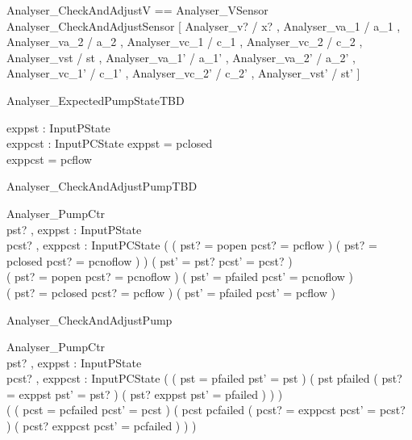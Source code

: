 \documentclass{article}
\begin{document}
\begin{zed}
	Analyser\_CheckAndAdjustV == Analyser\_VSensor \land Analyser\_CheckAndAdjustSensor [ Analyser\_v? / x? , Analyser\_va\_1 / a\_1 , Analyser\_va\_2 / a\_2 , Analyser\_vc\_1 / c\_1 , Analyser\_vc\_2 / c\_2 , Analyser\_vst / st , Analyser\_va\_1' / a\_1' , Analyser\_va\_2' / a\_2' , Analyser\_vc\_1' / c\_1' , Analyser\_vc\_2' / c\_2' , Analyser\_vst' / st' ]
\end{zed}

\begin{schema}{Analyser\_ExpectedPumpStateTBD}

 exppst : InputPState \\
 exppcst : InputPCState 
\where
 exppst = pclosed \\
 exppcst = pcflow
\end{schema}

\begin{schema}{Analyser\_CheckAndAdjustPumpTBD}

 \Delta Analyser\_PumpCtr \\
 pst? , exppst : InputPState \\
 pcst? , exppcst : InputPCState 
\where
 ( ( pst? = popen \land pcst? = pcflow ) \lor ( pst? = pclosed \land pcst? = pcnoflow ) ) \implies ( pst' = pst? \land pcst' = pcst? ) \\
 ( pst? = popen \land pcst? = pcnoflow ) \implies ( pst' = pfailed \land pcst' = pcnoflow ) \\
 ( pst? = pclosed \land pcst? = pcflow ) \implies ( pst' = pfailed \land pcst' = pcflow )
\end{schema}

\begin{schema}{Analyser\_CheckAndAdjustPump}

 \Delta Analyser\_PumpCtr \\
 pst? , exppst : InputPState \\
 pcst? , exppcst : InputPCState 
\where
 ( ( pst = pfailed \land pst' = pst ) \lor ( pst \neq pfailed \land ( pst? = exppst \implies pst' = pst? ) \land ( pst? \neq exppst \implies pst' = pfailed ) ) ) \\
 ( ( pcst = pcfailed \land pcst' = pcst ) \lor ( pcst \neq pcfailed \land ( pcst? = exppcst \implies pcst' = pcst? ) \land ( pcst? \neq exppcst \implies pcst' = pcfailed ) ) )
\end{schema}
\end{document}
